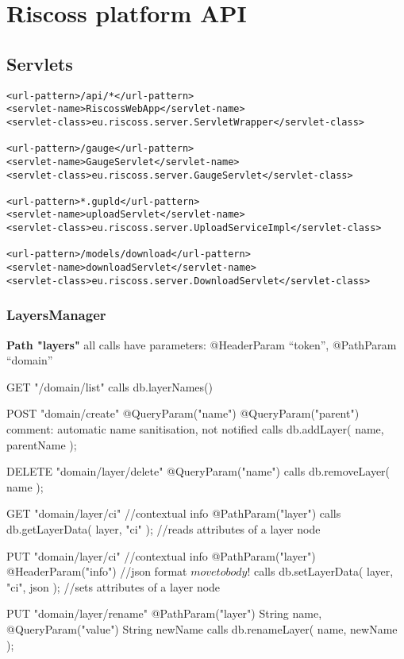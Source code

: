 \section{Riscoss platform API}

\subsection{Servlets}
\begin{verbatim}
<url-pattern>/api/*</url-pattern>
<servlet-name>RiscossWebApp</servlet-name>
<servlet-class>eu.riscoss.server.ServletWrapper</servlet-class>

<url-pattern>/gauge</url-pattern>
<servlet-name>GaugeServlet</servlet-name>
<servlet-class>eu.riscoss.server.GaugeServlet</servlet-class>

<url-pattern>*.gupld</url-pattern>
<servlet-name>uploadServlet</servlet-name>
<servlet-class>eu.riscoss.server.UploadServiceImpl</servlet-class>

<url-pattern>/models/download</url-pattern>
<servlet-name>downloadServlet</servlet-name>
<servlet-class>eu.riscoss.server.DownloadServlet</servlet-class>
\end{verbatim}

\subsubsection{LayersManager}

\textbf{Path "layers"}
all calls have parameters: 
    @HeaderParam ``token'', 
    @PathParam ``domain''

  GET "/{domain}/list"
    calls db.layerNames()
    
  POST "{domain}/create"
  	  @QueryParam("name")  
	  @QueryParam("parent")
	  comment: automatic name sanitisation, not notified
	calls db.addLayer( name, parentName );
	
  DELETE "{domain}/{layer}/delete"
  	  @QueryParam("name")
      calls db.removeLayer( name );
      
   GET "{domain}/{layer}/ci"  //contextual info
	  @PathParam("layer")
	calls db.getLayerData( layer, "ci" );  //reads attributes of a layer node
	
  PUT "{domain}/{layer}/ci"   //contextual info
	  @PathParam("layer")
	  @HeaderParam("info")  //json format $move to body!$
	calls db.setLayerData( layer, "ci", json ); //sets attributes of a layer node
	
   PUT "{domain}/{layer}/rename"
	@PathParam("layer") String name, 
	@QueryParam("value") String newName 
      calls db.renameLayer( name, newName );
      
